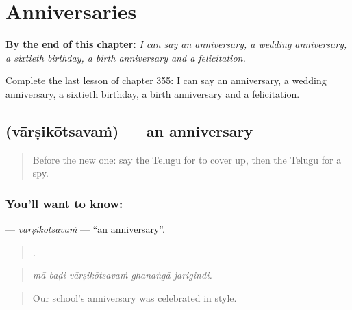 
\chapter{Anniversaries}
\label{ch:te-anniversaries}

\begin{chapteropening}
\textbf{By the end of this chapter:} \emph{I can say an anniversary, a wedding anniversary, a sixtieth birthday, a birth anniversary and a felicitation.}

Complete the last lesson of chapter 355: I can say an anniversary, a wedding anniversary, a sixtieth birthday, a birth anniversary and a felicitation.
\end{chapteropening}

\section[\texorpdfstring{\te{వార్షికోత్సవం} (vārṣikōtsavaṁ)}{వార్షికోత్సవం (vārṣikōtsavaṁ)}]{ (vārṣikōtsavaṁ) — an anniversary}

\label{lesson:TE-C355-varsikotsavam}



\begin{quote}
Before the new one: say the Telugu for to cover up, then the Telugu for a spy.
\end{quote}

\subsection*{You'll want to know: }
\textbf{} — \emph{vārṣikōtsavaṁ} — \textquotedblleft{}an anniversary\textquotedblright{}.

\begin{quote}
    .
\end{quote}

\begin{quote}
\emph{mā baḍi vārṣikōtsavaṁ ghanaṅgā jarigindi.}
\end{quote}

\begin{quote}
Our school's anniversary was celebrated in style.
\end{quote}

